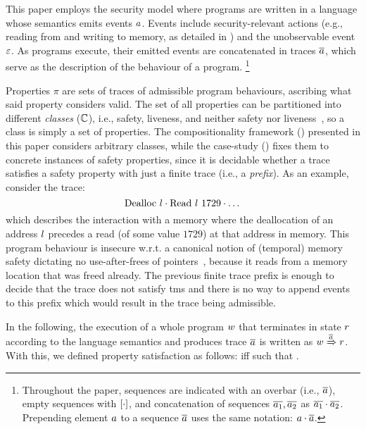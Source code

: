 \documentclass[dvipsnames,conference]{IEEEtran}
\theoremstyle{definition}
\begin{document}
This paper employs the security model where programs are written in a language whose semantics emits events $\event$.
Events include security-relevant actions (e.g., reading from and writing to memory, as detailed in ) and the unobservable event $\emptyevent$.
As programs execute, their emitted events are concatenated in traces $\trace$, which serve as the description of the behaviour of a program.%
\footnote{
Throughout the paper, sequences are indicated with an overbar (i.e., $\trace$), empty sequences with $\hole{\cdot}$, and concatenation of sequences $\trace[_{1}],\trace[_{2}]$ as $\trace[_{1}]\cdot\trace[_{2}]$.
Prepending element $\event$ to a sequence $\trace$ uses the same notation: $\event\cdot\trace$.
}

Properties $\pi$ are sets of traces of admissible program behaviours, ascribing what said property considers valid.
% 
The set of all properties can be partitioned into different {\em classes} ($\class$), i.e., safety, liveness, and neither safety nor liveness~\cite{clarkson2008hyper}, so a class is simply a set of properties.
% 
The compositionality framework () presented in this paper considers arbitrary classes, while the case-study () fixes them to concrete instances of safety properties, since it is decidable whether a trace satisfies a safety property with just a finite trace (i.e., a \emph{prefix}).
As an example, consider the trace:
$$\ev{Dealloc\ \loc}\cdot\ev{Read\ \loc\ 1729}\cdot\dots$$
which describes the interaction with a memory where the deallocation of an address $\loc$ precedes a read (of some value $1729$) at that address in memory.
% 
This program behaviour is insecure w.r.t. a canonical notion of (temporal) memory safety dictating no use-after-frees of pointers~\cite{nagarakatte2010cets,azevedo2018meaningsofms}, because it reads from a memory location that was freed already.
The previous finite trace prefix is enough to decide that the trace does not satisfy \gls*{tms} and there is no way to append events to this prefix which would result in the trace being admissible.

In the following, the execution of a whole program $\wholeprogvar$ that terminates in state $\runtimetermvar$ according to the language semantics and produces trace $\trace$ is written as $\progstepto{\wholeprogvar}{\runtimetermvar}{\trace}$.
With this, we defined property satisfaction as follows:
 iff  such that .
\end{document}
